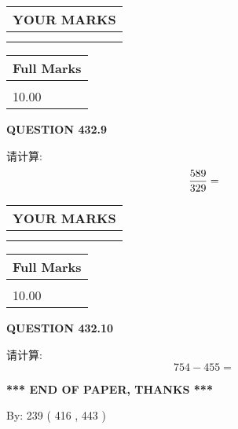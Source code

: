 \documentclass{ctexart}
\begin{document}
\noindent\begin{tabular}{|l|}
\hline
 YOUR MARKS  \\
\hline
 \\ 
 \\ 
\hline
\end{tabular}
\hspace{0.05in} \begin{tabular}{|l|}
\hline
 Full Marks  \\
\hline
 \\ 
10.00 \\
\hline
\end{tabular}
{\textbf{\Large{QUESTION
432.9 
}}}
  
  
 
请计算:
\begin{equation}
\frac { %
589 }  {  %
329} = \nonumber
\end{equation}
 

 

 
  
\vspace{0.2in}
  
\noindent\begin{tabular}{|l|}
\hline
 YOUR MARKS  \\
\hline
 \\ 
 \\ 
\hline
\end{tabular}
\hspace{0.05in} \begin{tabular}{|l|}
\hline
 Full Marks  \\
\hline
 \\ 
10.00 \\
\hline
\end{tabular}
{\textbf{\Large{QUESTION
432.10 
}}}
  
  
 
请计算:
\begin{equation}
754 -   %
455 = \nonumber
\end{equation}
 

 

 
   
   
 \vspace{0.2in}
 
   
   
   
   
\vspace{1.0in} 
{\textbf{\large{ *** END OF PAPER, THANKS *** }}} 
   
   
\hspace{1.0in} By: 
 239 ( 416 ,  443 )
   
\end{document}
